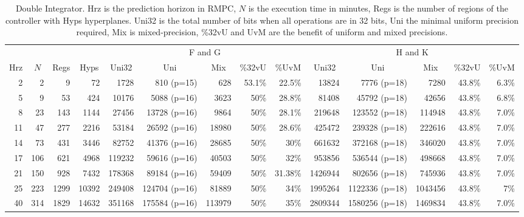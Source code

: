 \begin{table*}[p]
  \centering
  \caption{Double Integrator.\textmd{ Hrz is the prediction horizon in RMPC, $N$ is the execution time in minutes, Regs is the number of regions of the controller with Hyps hyperplanes. Uni32 is the total number of bits when all operations are in 32 bits, Uni the minimal uniform precision required, Mix is mixed-precision, \%32vU and UvM are the benefit of uniform and mixed precisions.}}
  \label{tab:di}
  \begin{tabular}{rrrr|rrrrr|rrrrr}
    \toprule
    \multicolumn{4}{c}{} & \multicolumn{5}{|c|}{F and G} & \multicolumn{5}{c}{H and K} \\
    \multicolumn{1}{c}{Hrz}&
    \multicolumn{1}{c}{$N$}&
    \multicolumn{1}{c}{Regs} &
    \multicolumn{1}{c}{Hyps} &
    \multicolumn{1}{|c}{Uni32}&
    \multicolumn{1}{c}{Uni}&
    \multicolumn{1}{c}{Mix}&
    \multicolumn{1}{c}{\%32vU}&
    \multicolumn{1}{c}{\%UvM}&
    \multicolumn{1}{|c}{Uni32}&
    \multicolumn{1}{c}{Uni}&
    \multicolumn{1}{c}{Mix}&
    \multicolumn{1}{c}{\%32vU}&
    \multicolumn{1}{c}{\%UvM} \\
    \midrule
    2 & 2 & 9 & 72 & 1728 & 810 (p=15) & 628 & 53.1\% & 22.5\% & 13824 & 7776 (p=18) & 7280 & 43.8\%& 6.3\% \\
    5 & 9 & 53 & 424 & 10176 & 5088 (p=16) & 3623 & 50\% & 28.8\% & 81408 & 45792 (p=18) & 42656 & 43.8\% & 6.8\% \\
    8 & 23 & 143 & 1144 & 27456 & 13728 (p=16) & 9864 & 50\%  & 28.1\% & 219648 & 123552 (p=18) & 114948 & 43.8\% & 7.0\% \\
    11 & 47 & 277 & 2216 & 53184 & 26592 (p=16) & 18980 & 50\% & 28.6\% & 425472 & 239328 (p=18) & 222616 & 43.8\% & 7.0\% \\
    
    14 & 73 & 431& 3446& 82752& 41376 (p=16)& 28685& 50\% & 30\% & 661632& 372168 (p=18)& 346020& 43.8\% &7.0\% \\
    
    17 & 106 & 621 & 4968 & 119232 & 59616 (p=16) & 40503 & 50\% & 32\% & 953856& 536544 (p=18)& 498668& 43.8\% & 7.0\% \\
    
    21 & 150 & 928 & 7432 & 178368 & 89184 (p=16) & 59409 & 50\% & 31.38\% & 1426944 & 802656 (p=18) & 745936 & 43.8\% & 7.0\%  \\
    
    25 & 223 & 1299 & 10392 & 249408 & 124704 (p=16) & 81889 & 50\%& 34\%& 1995264 & 1122336 (p=18)& 1043456 & 43.8\%& 7\% \\
    
    40 & 314 & 1829& 14632& 351168& 175584 (p=16)& 113979& 50\%& 35\%& 2809344& 1580256 (p=18)& 1469834& 43.8\%& 7.0\% \\
    
    \bottomrule
  \end{tabular}
\end{table*}